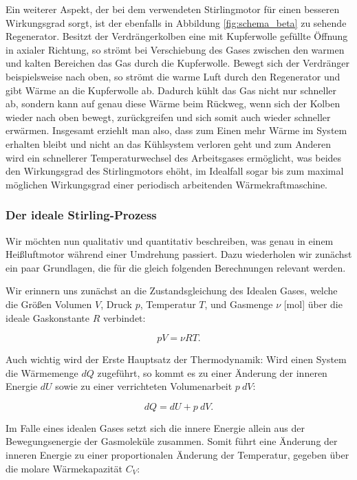 \documentclass{article}
\begin{document}
Ein weiterer Aspekt, der bei dem verwendeten Stirlingmotor für einen besseren Wirkungsgrad sorgt, ist der ebenfalls in Abbildung \ref{fig:schema_beta} zu sehende Regenerator. Besitzt der Verdrängerkolben eine mit Kupferwolle gefüllte Öffnung in axialer Richtung, so strömt bei Verschiebung des Gases zwischen den warmen und kalten Bereichen das Gas durch die Kupferwolle. Bewegt sich der Verdränger beispielsweise nach oben, so strömt die warme Luft durch den Regenerator und gibt Wärme an die Kupferwolle ab. Dadurch kühlt das Gas nicht nur schneller ab, sondern kann auf genau diese Wärme beim Rückweg, wenn sich der Kolben wieder nach oben bewegt, zurückgreifen und sich somit auch wieder schneller erwärmen. Insgesamt erziehlt man also, dass zum Einen mehr Wärme im System erhalten bleibt und nicht an das Kühlsystem verloren geht und zum Anderen wird ein schnellerer Temperaturwechsel des Arbeitsgases ermöglicht, was beides den Wirkungsgrad des Stirlingmotors ehöht, im Idealfall sogar bis zum maximal möglichen Wirkungsgrad einer periodisch arbeitenden Wärmekraftmaschine. 

\newpage
\subsubsection{Der ideale Stirling-Prozess}

Wir möchten nun qualitativ und quantitativ beschreiben, was genau in einem Heißluftmotor während einer Umdrehung passiert. Dazu wiederholen wir zunächst ein paar Grundlagen, die für die gleich folgenden Berechnungen relevant werden.

Wir erinnern uns zunächst an die Zustandsgleichung des Idealen Gases, welche die Größen Volumen $V$, Druck $p$, Temperatur $T$, und Gasmenge $\nu$ [mol] über die ideale Gaskonstante $R$ verbindet:

\begin{equation}
    pV = \nu R T.
    \label{eq:idealesGasgesetz}
\end{equation}

Auch wichtig wird der Erste Hauptsatz der Thermodynamik: Wird einen System die Wärmemenge $dQ$ zugeführt, so kommt es zu einer Änderung der inneren Energie $dU$ sowie zu einer verrichteten Volumenarbeit $p \ dV$:

\begin{equation}
    dQ = dU + p \ dV.
    \label{eq:1.HS_Thermodynamik}
\end{equation}

Im Falle eines idealen Gases setzt sich die innere Energie allein aus der Bewegungsenergie der Gasmoleküle zusammen. Somit führt eine Änderung der inneren Energie zu einer proportionalen Änderung der Temperatur, gegeben über die molare Wärmekapazität $C_V$:
\end{document}
